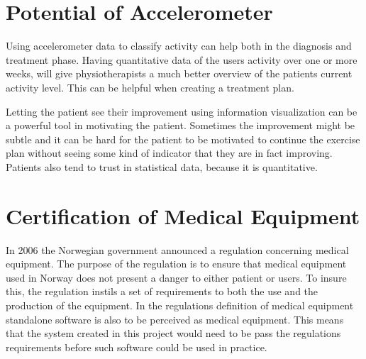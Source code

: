 \section{Potential of Accelerometer}
Using accelerometer data to classify activity can help both in the diagnosis and treatment phase. Having quantitative data of the users activity over one or more weeks, will give physiotherapists a much better overview of the patients current activity level. This can be helpful when creating a treatment plan.

Letting the patient see their improvement using information visualization can be a powerful tool in motivating the patient. Sometimes the improvement might be subtle and it can be hard for the patient to be motivated to continue the exercise plan without seeing some kind of indicator that they are in fact improving. Patients also tend to trust in statistical data, because it is quantitative. 

\section{Certification of Medical Equipment}
In 2006 the Norwegian government announced a regulation concerning medical equipment. The purpose of the regulation is to ensure that medical equipment used in Norway does not present a danger to either patient or users. To insure this, the regulation instils a set of requirements to both the use and the production of the equipment. In the regulations definition of medical equipment standalone software is also to be perceived as medical equipment. This means that the system created in this project would need to be pass the regulations requirements before such software could be used in practice. 
